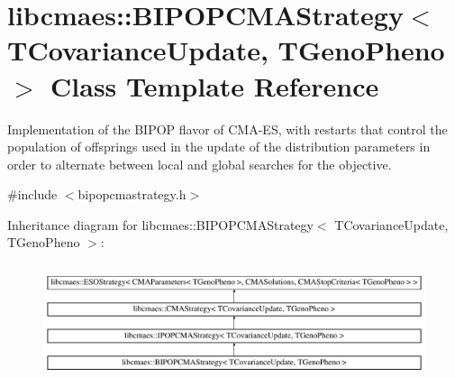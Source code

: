 \hypertarget{classlibcmaes_1_1BIPOPCMAStrategy}{\section{libcmaes\+:\+:B\+I\+P\+O\+P\+C\+M\+A\+Strategy$<$ T\+Covariance\+Update, T\+Geno\+Pheno $>$ Class Template Reference}
\label{classlibcmaes_1_1BIPOPCMAStrategy}
}


Implementation of the B\+I\+P\+O\+P flavor of C\+M\+A-\/\+E\+S, with restarts that control the population of offsprings used in the update of the distribution parameters in order to alternate between local and global searches for the objective.  




{\ttfamily \#include $<$bipopcmastrategy.\+h$>$}

Inheritance diagram for libcmaes\+:\+:B\+I\+P\+O\+P\+C\+M\+A\+Strategy$<$ T\+Covariance\+Update, T\+Geno\+Pheno $>$\+:\begin{figure}[H]
\begin{center}
\leavevmode
\includegraphics[height=3.430321cm]{classlibcmaes_1_1BIPOPCMAStrategy}
\end{center}
\end{figure}
